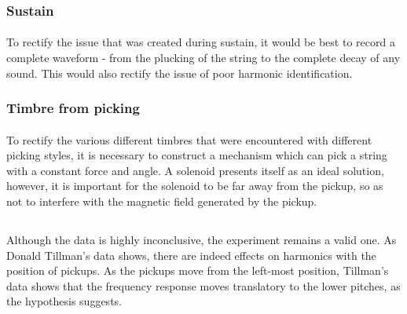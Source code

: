 \documentclass{article}
\begin{document}
\subsubsection{Sustain}
\paragraph*{}
To rectify the issue that was created during sustain, it would be best to 
record a complete waveform - from the plucking of the string to the complete 
decay of any sound. This would also rectify the issue of poor harmonic 
identification.

\subsubsection{Timbre from picking}
\paragraph*{}
To rectify the various different timbres that were encountered with different 
picking styles, it is necessary to construct a mechanism which can pick a 
string with a constant force and angle. A solenoid presents itself as an 
ideal solution, however, it is important for the solenoid to be far away from 
the pickup, so as not to interfere with the magnetic field generated by the 
pickup.

\subsection*{}
\paragraph*{}
Although the data is highly inconclusive, the experiment remains a valid one. 
As Donald Tillman's data shows, there are indeed effects on harmonics with the 
position of pickups. As the pickups move from the left-most position, 
Tillman's data shows that the frequency response moves translatory to the 
lower pitches, as the hypothesis suggests.

\clearpage
\pagebreak
\end{document}
